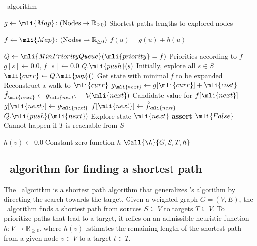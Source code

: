 \begin{algorithm}[t]
	\caption{\A~algorithm} \label{alg:astar}
	\begin{algorithmic}[1]
		\State $g \gets \mli{Map}\colon (\text{Nodes} \to \mathbb{R}_{\geq 0})$
		\Comment Shortest paths lengths to explored nodes

		\State $f \gets \mli{Map}\colon (\text{Nodes} \to \mathbb{R}_{\geq 0})$
		\Comment $f(u)=g(u)+h(u)$ 

		\State $Q \gets \mli{MinPriorityQueue}(\mli{priority}=f)$ 
		\Comment Priorities according to $f$
			\State $g[s] \gets 0.0,\, f[s] \gets 0.0$
			\State $Q.\mli{push}(s)$
			\Comment Initially, explore all $s \in S$
		\EndFor
			\State $\mli{curr} \gets Q.\mli{pop}()$
			\Comment Get state with minimal $f$ to be expanded
				\State \Return {}
				\Comment Reconstruct a walk to $\mli{curr}$
			\EndIf
			\State $g_\mli{next} \gets g[\mli{curr}] + \mli{cost}$
			\State $\hat{f}_\mli{next} \gets g_\mli{next} + h(\mli{next})$
				\Comment Candidate value for $f[\mli{next}]$
					\State $g[\mli{next}] \gets g_\mli{next}$		
					\State $f[\mli{next}] \gets \hat{f}_\mli{next}$		
					\State $Q.\mli{push}(\mli{next})$
					\Comment Explore state $\mli{next}$
				\EndIf
		\EndFor
		\EndWhile
		\State \textbf{assert} $\mli{False}$
		\Comment Cannot happen if $T$ is reachable from $S$
		\EndFunction

		\Statex

			\State $h(v) \gets 0.0$
			\Comment Constant-zero function $h$
			\State $\Call{\A}{G,S,T,h}$
		\EndFunction
	\end{algorithmic}
\end{algorithm}


\subsection{\A~algorithm for finding a shortest path} \label{SEEDsec:astar}
%
The \A~algorithm is a shortest path algorithm that generalizes \dijkstra's
algorithm by directing the search towards the target.
Given a weighted graph $G=(V,E)$, the \A~algorithm finds a shortest path from
sources $S \subseteq V$ to targets $T \subseteq V$.
%
To prioritize paths that lead to a target, it relies on an admissible heuristic
function $h \colon V \to \mathbb{R}_{\geq 0}$, where $h(v)$ estimates the
remaining length of the shortest path from a given node $v \in V$ to a target
$t \in T$.


